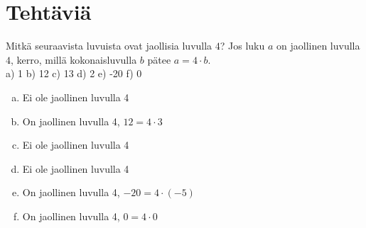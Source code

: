     
    
    
    \section*{Tehtäviä}
    
    \begin{tehtava}
    Mitkä seuraavista luvuista ovat jaollisia luvulla $4$? Jos luku $a$ on jaollinen luvulla $4$, kerro, millä kokonaisluvulla $b$ pätee $a = 4 \cdot b$.\\
    a) 1 \quad b) 12  \quad c) 13 \quad d) 2 \quad e) -20 \quad f) 0
    
    \begin{vastaus}
    \begin{enumerate}[a)]
    	\item Ei ole jaollinen luvulla 4
    	\item On jaollinen luvulla 4, $12 = 4 \cdot 3$
    	\item Ei ole jaollinen luvulla 4
    	\item Ei ole jaollinen luvulla 4
    	\item On jaollinen luvulla 4, $-20 = 4 \cdot (-5)$
    	\item On jaollinen luvulla 4, $0 = 4 \cdot 0$
    \end{enumerate}
    \end{vastaus}
    \end{tehtava}
    
